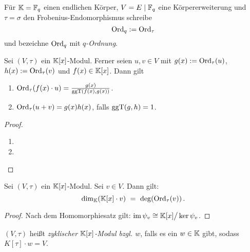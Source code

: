 \begin{notation}
  Für $\mathbb{K} = \mathbb{F}_q$ einen endlichen Körper, $V = E \mid \mathbb{F}_q$ eine 
  Körpererweiterung und $\tau = \sigma$ den Frobenius-Endomorphismus schreibe
  \[ \operatorname{Ord}_q := \operatorname{Ord}_\tau \]
  und bezeichne $\operatorname{Ord}_q$ mit \emph{$q$-Ordnung}.
\end{notation}

\begin{lemma}
  \label{lemma:eigenschaften-tau-ordnung}
  Sei $(V,\tau)$ ein $\mathbb{K}[x]$-Modul. Ferner seien
  $u,v\in V$ mit $g(x) := \operatorname{Ord}_\tau(u)$, $h(x) := \operatorname{Ord}_\tau(v)$ und 
  $f(x) \in \mathbb{K}[x]$. Dann gilt
  \begin{enumerate}
    \item $\operatorname{Ord}_\tau(f(x)\cdot u) = \frac{g(x)}{\operatorname{ggT}(f(x),g(x))}$.
    \item $\operatorname{Ord}_\tau(u+v) = g(x)h(x)$, falls $\operatorname{ggT}(g,h) = 1$.
  \end{enumerate}
\end{lemma}
\begin{proof}
  \begin{enumerate}
    \item \TODO
    \item \TODO
  \end{enumerate}
\end{proof}

\begin{lemma}
  Sei $(V,\tau)$ ein $\mathbb{K}[x]$-Modul. Sei $v\in V$. Dann gilt:
  \[ \dim_\mathbb{K}( \mathbb{K}[x]\cdot v ) \ =\  \deg( \operatorname{Ord}_\tau(v) )\,.\]
\end{lemma}
\begin{proof}
  Nach dem Homomorphiesatz gilt: 
  $ \operatorname{im}\psi_v \cong \mathbb{K}[x] \big/ \ker \psi_v$.
\end{proof}


\begin{definition}
  $(V,\tau)$ heißt \emph{zyklischer $\mathbb{K}[x]$-Modul bzgl. $w$}, falls es ein 
  $w\in \mathbb{K}$ gibt, sodass $K[\tau]\cdot w = V$.
\end{definition}


